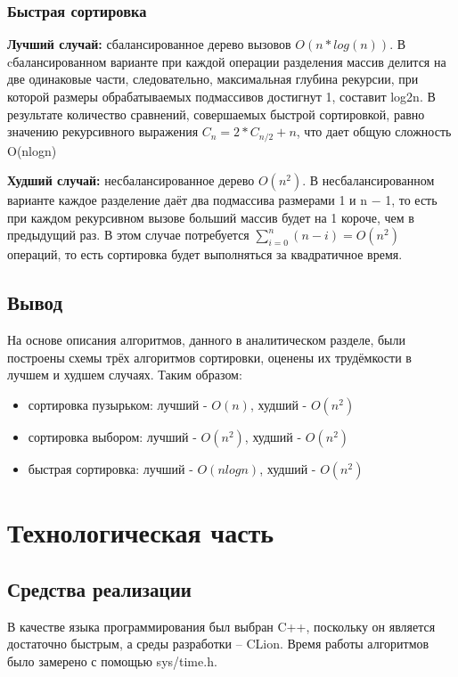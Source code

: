 \documentclass{report}
\begin{document}
\subsection{Быстрая сортировка}
\textbf{Лучший случай:} сбалансированное дерево вызовов \(O(n*log(n))\). 
В cбалансированном варианте при каждой операции разделения массив делится на две одинаковые части, следовательно, максимальная глубина рекурсии, при которой размеры обрабатываемых подмассивов достигнут 1, составит log2n. В результате количество сравнений, совершаемых быстрой сортировкой, равно значению рекурсивного выражения $C_n = 2 * C_{n / 2} + n$, что дает общую сложность O(nlogn)

\textbf{Худший случай:} несбалансированное дерево $O(n^2)$.
В несбалансированном варианте каждое разделение даёт два подмассива размерами 1 и n − 1, то есть при каждом рекурсивном вызове больший массив будет на 1 короче, чем в предыдущий раз. В этом случае потребуется $\sum_{{i=0}}^{n}(n-i)=O(n^{2})$ операций, то есть сортировка будет выполняться за квадратичное время.


\section{Вывод}

На основе описания алгоритмов, данного в аналитическом разделе, были построены схемы трёх алгоритмов сортировки, оценены их трудёмкости в лучшем и худшем случаях. Таким образом:
\begin{itemize}
\item сортировка пузырьком: лучший - $O(n)$, худший - $O(n^2)$ 
\item сортировка выбором: лучший - $O(n^2)$, худший - $O(n^2)$ 
\item быстрая сортировка: лучший - $O(nlogn)$, худший - $O(n^2)$ 
\end{itemize}
\chapter{Технологическая часть}

\section{Средства реализации}

В качестве языка программирования был выбран C++, поскольку он является достаточно быстрым, а среды разработки -- CLion. Время работы алгоритмов было замерено с помощью sys/time.h.
\end{document}
